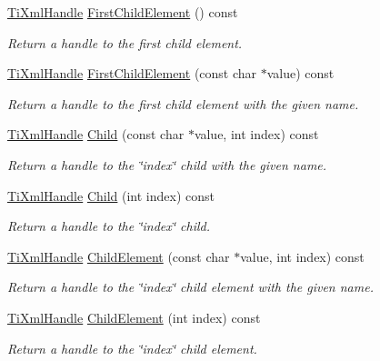 \begin{DoxyCompactItemize}
\hyperlink{class_ti_xml_handle}{TiXmlHandle} \hyperlink{class_ti_xml_handle_a24d1112e995e937e4dddb202d4113d4a}{FirstChildElement} () const 
\begin{DoxyCompactList}\small\item\em Return a handle to the first child element. \end{DoxyCompactList}\item 
\hyperlink{class_ti_xml_handle}{TiXmlHandle} \hyperlink{class_ti_xml_handle_af0aea751320f5e430fac6f8fff3b8dd4}{FirstChildElement} (const char $\ast$value) const 
\begin{DoxyCompactList}\small\item\em Return a handle to the first child element with the given name. \end{DoxyCompactList}\item 
\hyperlink{class_ti_xml_handle}{TiXmlHandle} \hyperlink{class_ti_xml_handle_a072492b4be1acdb0db2d03cd8f71ccc4}{Child} (const char $\ast$value, int index) const 
\begin{DoxyCompactList}\small\item\em Return a handle to the \char`\"{}index\char`\"{} child with the given name. \end{DoxyCompactList}\item 
\hyperlink{class_ti_xml_handle}{TiXmlHandle} \hyperlink{class_ti_xml_handle_af9cf6a7d08a5da94a8924425ad0cd5ac}{Child} (int index) const 
\begin{DoxyCompactList}\small\item\em Return a handle to the \char`\"{}index\char`\"{} child. \end{DoxyCompactList}\item 
\hyperlink{class_ti_xml_handle}{TiXmlHandle} \hyperlink{class_ti_xml_handle_a979a3f850984a176ee884e394c7eed2d}{ChildElement} (const char $\ast$value, int index) const 
\begin{DoxyCompactList}\small\item\em Return a handle to the \char`\"{}index\char`\"{} child element with the given name. \end{DoxyCompactList}\item 
\hyperlink{class_ti_xml_handle}{TiXmlHandle} \hyperlink{class_ti_xml_handle_a8786475b9d1f1518492e3a46704c7ef0}{ChildElement} (int index) const 
\begin{DoxyCompactList}\small\item\em Return a handle to the \char`\"{}index\char`\"{} child element. \end{DoxyCompactList}\item 

\end{DoxyCompactItemize}
